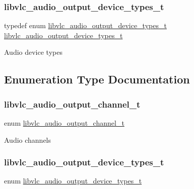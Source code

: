 \subsubsection{\texorpdfstring{libvlc\+\_\+audio\+\_\+output\+\_\+device\+\_\+types\+\_\+t}{libvlc\_audio\_output\_device\_types\_t}}
{\footnotesize\ttfamily typedef enum \hyperlink{group__libvlc__audio_ga588fc66806ea8599a17ab92c455c3cf2}{libvlc\+\_\+audio\+\_\+output\+\_\+device\+\_\+types\+\_\+t}  \hyperlink{group__libvlc__audio_ga588fc66806ea8599a17ab92c455c3cf2}{libvlc\+\_\+audio\+\_\+output\+\_\+device\+\_\+types\+\_\+t}}

Audio device types 

\subsection{Enumeration Type Documentation}
\mbox{\label{group__libvlc__audio_ga50e752d67eaa2738e0f914805b1b3a05}} 
\subsubsection{\texorpdfstring{libvlc\+\_\+audio\+\_\+output\+\_\+channel\+\_\+t}{libvlc\_audio\_output\_channel\_t}}
{\footnotesize\ttfamily enum \hyperlink{group__libvlc__audio_ga50e752d67eaa2738e0f914805b1b3a05}{libvlc\+\_\+audio\+\_\+output\+\_\+channel\+\_\+t}}

Audio channels \mbox{\label{group__libvlc__audio_ga588fc66806ea8599a17ab92c455c3cf2}} 
\subsubsection{\texorpdfstring{libvlc\+\_\+audio\+\_\+output\+\_\+device\+\_\+types\+\_\+t}{libvlc\_audio\_output\_device\_types\_t}}
{\footnotesize\ttfamily enum \hyperlink{group__libvlc__audio_ga588fc66806ea8599a17ab92c455c3cf2}{libvlc\+\_\+audio\+\_\+output\+\_\+device\+\_\+types\+\_\+t}}


